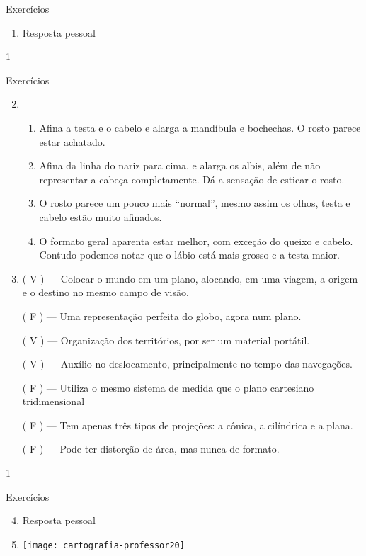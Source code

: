 {\exercise

\begin{answer}{Exercícios}
{
	\exerciselist
	\begin{enumerate}
	\item Resposta pessoal
	\end{enumerate}
}{1}
\end{answer}
\clearmargin
\begin{answer}{Exercícios}
{
	\exerciselist
	\begin{enumerate}\setcounter{enumi}{1}
	\item 
	\begin{enumerate}
	\item Afina a testa e o cabelo e alarga a mandíbula e bochechas. O rosto parece estar achatado.

	\item Afina da linha do nariz para cima, e alarga os albis, além de não representar a cabeça completamente. Dá a sensação de esticar o rosto.

	\item O rosto parece um pouco mais “normal”, mesmo assim os olhos, testa e cabelo estão muito afinados.

	\item O formato geral aparenta estar melhor, com exceção do queixo e cabelo. Contudo podemos notar que o lábio está mais grosso e a testa maior.
	\end{enumerate}
	\item
	({ }{V}{ }) --- Colocar o mundo em um plano, alocando, em uma viagem, a origem e o destino no mesmo campo de visão.

	({ }{F}{ }) --- Uma representação perfeita do globo, agora num plano.

	({ }{V}{ }) --- Organização dos territórios, por ser um material portátil.

	({ }{V}{ }) --- Auxílio no deslocamento, principalmente no tempo das navegações.

	({ }{F}{ }) --- Utiliza o mesmo sistema de medida que o plano cartesiano tridimensional

	({ }{F}{ }) --- Tem apenas três tipos de projeções: a cônica, a cilíndrica e a plana.

	({ }{F}{ }) --- Pode ter distorção de área, mas nunca de formato.
	\end{enumerate}
}{1}
\end{answer}
\clearmargin
\begin{answer}{Exercícios}
{
	\exerciselist
	\begin{enumerate}\setcounter{enumi}{3}
	\item Resposta pessoal
	\item
	{
	\texttt{[image: cartografia-professor20]}
	}


\end{enumerate}}
\end{answer}}

